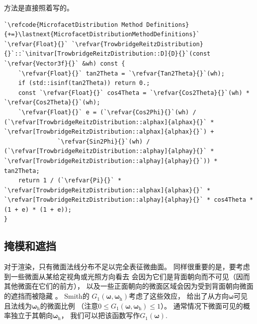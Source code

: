 方法是直接照着写的。
\begin{lstlisting}
`\refcode{MicrofacetDistribution Method Definitions}{+=}\lastnext{MicrofacetDistributionMethodDefinitions}`
`\refvar{Float}{}` `\refvar{TrowbridgeReitzDistribution}{}`::`\initvar[TrowbridgeReitzDistribution::D]{D}{}`(const `\refvar{Vector3f}{}` &wh) const {
    `\refvar{Float}{}` tan2Theta = `\refvar{Tan2Theta}{}`(wh);
    if (std::isinf(tan2Theta)) return 0.;
    const `\refvar{Float}{}` cos4Theta = `\refvar{Cos2Theta}{}`(wh) * `\refvar{Cos2Theta}{}`(wh);
    `\refvar{Float}{}` e = (`\refvar{Cos2Phi}{}`(wh) / (`\refvar[TrowbridgeReitzDistribution::alphax]{alphax}{}` * `\refvar[TrowbridgeReitzDistribution::alphax]{alphax}{}`) +
               `\refvar{Sin2Phi}{}`(wh) / (`\refvar[TrowbridgeReitzDistribution::alphay]{alphay}{}` * `\refvar[TrowbridgeReitzDistribution::alphay]{alphay}{}`)) * tan2Theta;
    return 1 / (`\refvar{Pi}{}` * `\refvar[TrowbridgeReitzDistribution::alphax]{alphax}{}` * `\refvar[TrowbridgeReitzDistribution::alphay]{alphay}{}` * cos4Theta * (1 + e) * (1 + e));
}
\end{lstlisting}

\subsection{掩模和遮挡}\label{sub:掩模和遮挡}
对于渲染，只有微面法线分布不足以完全表征微曲面。
同样很重要的是，要考虑到一些微面从某给定视角或光照方向看去
会因为它们是背面朝向而不可见（因而其他微面在它们的前方），
以及一些正面朝向的微面区域会因为受到背面朝向微面的遮挡而被隐藏
。
Smith的
$G_1({\bm\omega},{\bm\omega}_{\mathrm{h}})$考虑了这些效应，
给出了从方向$\bm\omega$可见且法线为${\bm\omega}_{\mathrm{h}}$的微面比例
（注意$0\le G_1({\bm\omega},{\bm\omega}_{\mathrm{h}})\le 1$）。
通常情况下微面可见的概率独立于其朝向${\bm\omega}_{\mathrm{h}}$，
我们可以把该函数写作$G_1({\bm\omega})$.

